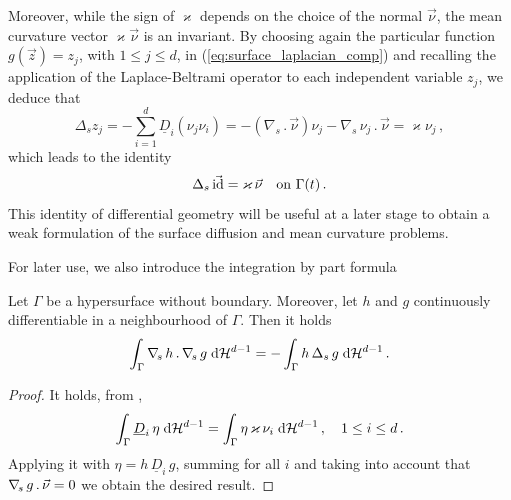 Moreover, while the sign of $\varkappa$ depends on the choice of the normal
$\vec\nu$, the mean curvature vector $\varkappa \vec\nu$ is an invariant. By
choosing again the particular function $g(\vec z) = z_j$, with $1 \leq j \leq
d$, in (\ref{eq:surface_laplacian_comp}) and recalling the application of the
Laplace-Beltrami operator to each independent variable $z_j$, we deduce that
\begin{equation}
\Delta_s z_j = - \sum_{i = 1}^d \underline{D}_i (\nu_j \nu_i) =
- (\nabla_s \,.\, \vec\nu) \nu_j - \nabla_s \, \nu_j \,.\, \vec\nu = \varkappa
\nu_j\, ,
\end{equation}
which leads to the identity
\begin{equation} \label{eq:LBop}
\Delta_s\, \vec {\rm id} = \varkappa\, \vec\nu \quad \mbox{on $\Gamma(t)$}\,.
\end{equation}
This identity of differential geometry will be useful at a later stage to
obtain a weak formulation of the surface diffusion and mean curvature problems.

For later use, we also introduce the integration by part formula
\begin{lemma}
Let $\Gamma$ be a hypersurface without boundary. Moreover, let $h$ and $g$
continuously differentiable in a neighbourhood of $\Gamma$. Then it holds
\begin{equation}\label{eq:integration_by_part}
\int_\Gamma \nabla_{\!s}\, h\,.\,\nabla_{\!s}\, g \;{\rm d}{\cal H}^{d-1}
=-\int_\Gamma h\,\Delta_s\, g\;{\rm d}{\cal H}^{d-1}\,.
\end{equation}
\end{lemma}

\begin{proof}
It holds, from \cite[Lemma~16.1]{GilbargT83},
\begin{equation*}
\int_\Gamma \underline{D}_i\,\eta \;{\rm d}{\cal H}^{d-1} =
\int_\Gamma \eta\,\varkappa\,\nu_i\;{\rm d}{\cal H}^{d-1}\,,
\quad 1 \leq i \leq d\,.
\end{equation*}
Applying it with $\eta=h\,\underline{D}_i\,g$,
summing for all $i$ and taking into
account that $\nabla_{\!s}\,g\,.\,\vec \nu=0$ we obtain the desired result.
\end{proof}

